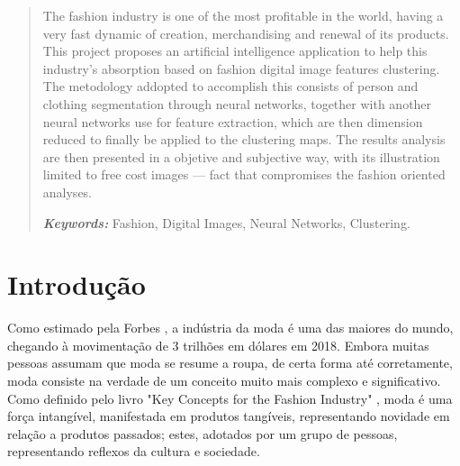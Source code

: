 \documentclass[12pt]{report}
\providecommand{\keywords}[1]{\textbf{\textit{Keywords: }} #1}
\begin{document}
\newpage


\begin{abstract}
  The fashion industry is one of the most profitable in the world, having a very fast dynamic of creation, merchandising and renewal of its products. This project proposes an artificial intelligence application to help this industry's absorption based on fashion digital image features clustering. The metodology addopted to accomplish this consists of person and clothing segmentation through neural networks, together with another neural networks use for feature extraction, which are then dimension reduced to finally be applied to the clustering maps. The results analysis are then presented in a objetive and subjective way, with its illustration limited to free cost images --- fact that compromises the fashion oriented analyses. 
  
  \keywords{Fashion, Digital Images, Neural Networks, Clustering.}

\end{abstract}

\newpage



\listoffigures

\newpage


{\centering
\printacronyms[include-classes=abbrev,name=Abreviações]
}
\tableofcontents


\newpage



\chapter{Introdução}
\label{cha:introducao}

Como estimado pela Forbes \cite{Forbes}, a indústria da moda é uma das maiores do mundo, chegando à movimentação de 3 trilhões em dólares em 2018. Embora muitas pessoas assumam que moda se resume a roupa, de certa forma até corretamente, moda consiste na verdade de um conceito muito mais complexo e significativo. Como definido pelo livro "Key Concepts for the Fashion Industry" \cite{key}, moda é uma força intangível, manifestada em produtos tangíveis, representando novidade em relação a produtos passados; estes, adotados por um grupo de pessoas, representando reflexos da cultura e sociedade. 
\end{document}
